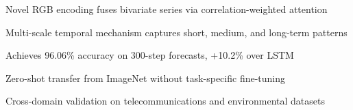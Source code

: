 
\begin{highlights}
\item Novel RGB encoding fuses bivariate series via correlation-weighted attention
\item Multi-scale temporal mechanism captures short, medium, and long-term patterns
\item Achieves 96.06\% accuracy on 300-step forecasts, +10.2\% over LSTM
\item Zero-shot transfer from ImageNet without task-specific fine-tuning
\item Cross-domain validation on telecommunications and environmental datasets
\end{highlights}
